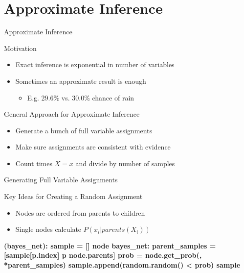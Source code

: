 \documentclass[14pt]{beamer}
\begin{document}
\section{Approximate Inference}
\begin{frame}{Approximate Inference}
	\begin{block}{Motivation}
		\begin{itemize}
			\item Exact inference is exponential in number of variables
			\item Sometimes an approximate result is enough
				\begin{itemize}
					\item E.g. 29.6\% vs. 30.0\% chance of rain
				\end{itemize}
		\end{itemize}
	\end{block}
	\pause
	\begin{block}{General Approach for Approximate Inference}
		\begin{itemize}
			\item Generate a bunch of full variable assignments
			\item Make sure assignments are consistent with evidence
			\item Count times $X\!=\!x$ and divide by number of samples
		\end{itemize}
	\end{block}
\end{frame}
\begin{frame}[fragile]{Generating Full Variable Assignments}
	\begin{block}{Key Ideas for Creating a Random Assignment}
		\begin{itemize}
			\item Nodes are ordered from parents to children
			\item Single nodes calculate $P(x_{i}|\textit{parents}(X_{i}))$
		\end{itemize}
	\end{block}
	\pause
	\bigskip
	\begin{semiverbatim}\scriptsize\bfseries
		 (bayes_net):
		    \pause{}
		    sample = []
		     node  bayes_net:
		        \pause{}
		        parent_samples = [sample[p.index]  p  node.parents]
		        \pause{}
		        prob = node.get_prob(, *parent_samples)
		        \pause{}
		        sample.append(random.random() < prob)
		    \pause{}
		     sample
	\end{semiverbatim}
\end{frame}
\end{document}
